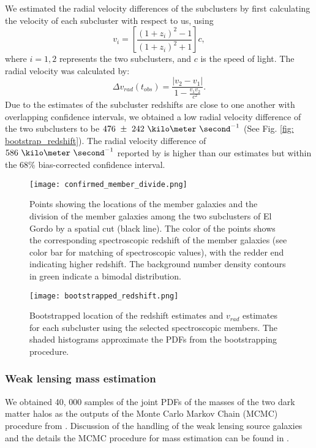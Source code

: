 We estimated the radial velocity differences of the
subclusters by first calculating the velocity of each subcluster with
respect to us, using  
\begin{equation}
	v_i = \left[ \frac{(1+z_i)^2 - 1 }{(1+z_i)^2 + 1 }\right]c,
\end{equation}
where $i=1, 2$ represents the two subclusters, and $c$ is the speed of
light. The radial velocity was calculated by: 
\begin{equation}
	\Delta v_{rad}(t_{obs}) = \frac{|v_2 - v_1|}{1-\frac{v_1 v_2}{c^2}}.
\end{equation}
Due to the estimates of the subcluster redshifts are close to
one another with overlapping confidence intervals, we obtained a low 
radial velocity difference of the two subclusters to be
$476~\pm~242~\kilo\meter~\second^{-1}$ (See Fig. \ref{fig:
bootstrap_redshift}). 
The radial velocity difference of $586~\kilo \meter~\second^{-1}$ reported by  
is higher than our estimates but within the 68\% bias-corrected
confidence interval. 
\begin{figure}
	\texttt{[image: confirmed\_member\_divide.png]}
	\caption{\label{fig:membership} Points showing the locations of the
	member galaxies and the division of the member galaxies among the two subclusters of El Gordo by a spatial cut
(black line). The color of the points shows the corresponding spectroscopic
redshift of the member galaxies (see color bar for matching of
spectroscopic values), with the redder end indicating higher
redshift. The background number density contours in green indicate a bimodal
distribution.} 
\end{figure}
\begin{figure}
	\texttt{[image: bootstrapped\_redshift.png]}
	\caption{\label{fig: bootstrap_redshift} Bootstrapped location of the
	redshift estimates and $v_{rad}$ estimates for each subcluster using the
	selected spectroscopic members. The shaded histograms approximate the
	PDFs from the bootstrapping procedure.
} 
\end{figure}
\subsubsection{Weak lensing mass estimation} 
We obtained 40, 000 samples of the joint PDFs of the masses of the two dark
matter halos as the outputs of the Monte Carlo Markov Chain (MCMC)
procedure from \citealt{Jee13}. Discussion of the handling of the weak
lensing source galaxies and the details the MCMC procedure for mass
estimation can be found in \citealt{Jee13}. 
